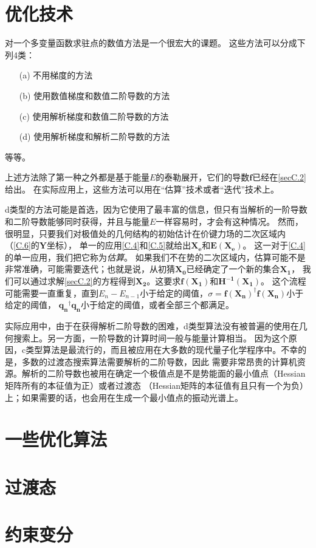 \section{优化技术}
对一个多变量函数求驻点的数值方法是一个很宏大的课题。
这些方法可以分成下列4类：
\begin{enumerate}
	\item[(a) ] 不用梯度的方法
	\item[(b) ] 使用数值梯度和数值二阶导数的方法
	\item[(c) ] 使用解析梯度和数值二阶导数的方法
	\item[(d) ] 使用解析梯度和解析二阶导数的方法
\end{enumerate}
等等。

上述方法除了第一种之外都是基于能量$E$的泰勒展开，它们的导数$\mathbf{f}$已经在\autoref{secC.2}给出。
在实际应用上，这些方法可以用在“估算”技术或者“迭代”技术上。

d类型的方法可能是首选，因为它使用了最丰富的信息，但只有当解析的一阶导数和二阶导数能够同时获得，并且与能量$E$一样容易时，才会有这种情况。
然而，很明显，只要我们对极值处的几何结构的初始估计在价键力场的二次区域内（\autoref{C.6}的$\mathbf{Y}$坐标），
单一的应用\autoref{C.4}和\autoref{C.5}就给出$\mathbf{X_e}$和$\mathbf{E(X_e)}$。
这一对于\autoref{C.4}的单一应用，我们把它称为\textit{估算}。
如果我们不在势的二次区域内，估算可能不是非常准确，可能需要迭代；也就是说，从初猜$\mathbf{X_0}$已经确定了一个新的集合$\mathbf{X_1}$，
我们可以通过求解\autoref{secC.2}的方程得到$\mathbf{X_2}$。这要求$\mathbf{f(X_1)}$和$\mathbf{H^{-1}(X_1)}$。
这个流程可能需要一直重复，直到$E_n-E_{n-1}$小于给定的阈值，$\sigma =\mathbf{f(X_n)}^{\dagger}\mathbf{f(X_n)}$小于给定的阈值，
$\mathbf{q_n}^{\dagger}\mathbf{q_n}$小于给定的阈值，或者全部三个都满足。

实际应用中，由于在获得解析二阶导数的困难，d类型算法没有被普遍的使用在几何搜索上。另一方面，一阶导数的计算时间一般与能量计算相当。
因为这个原因，c类型算法是最流行的，而且被应用在大多数的现代量子化学程序中。不幸的是，多数的过渡态搜索算法需要解析的二阶导数，因此
需要非常昂贵的计算机资源。解析的二阶导数也被用在确定一个极值点是不是势能面的最小值点（Hessian矩阵所有的本征值为正）或者过渡态
（Hessian矩阵的本征值有且只有一个为负）上；如果需要的话，也会用在生成一个最小值点的振动光谱上。

\section{一些优化算法}
\section{过渡态}
\section{约束变分}
\newpage
\theendnotes
{}
